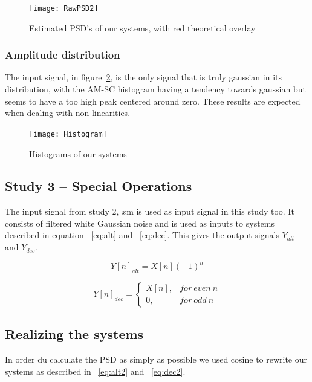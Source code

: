 \documentclass[10pt]{article}
\begin{document}
\begin{figure}[!hp]

    \begin{center}
      \texttt{[image: RawPSD2]}
    \caption{Estimated PSD's of our systems, with red theoretical overlay \label{fig:RawPSD2}}
    \end{center}

\end{figure}

\subsubsection{Amplitude distribution}
The input signal, in figure~\ref{fig:hist}, is the only signal that is truly gaussian in its distribution,
with the AM-SC histogram having a tendency towards gaussian but seems to have a
too high peak centered around zero. These results are expected when dealing with
non-linearities.

\begin{figure}[!hp]

    \begin{center}
      \texttt{[image: Histogram]}
    \caption{Histograms of our systems \label{fig:hist}}
    \end{center}

\end{figure}


\clearpage

\subsection{Study 3 – Special Operations}
The input signal from study 2, $x$m is used as input signal in this study too. It consists of
filtered white Gaussian noise and is used as inputs to systems described in equation ~\ref{eq:alt}
and ~\ref{eq:dec}. This gives the output signals $Y_{alt}$ and $Y_{dec}$.

\begin{equation}
  \label{eq:alt}
  Y[n]_{alt} =X[n](-1)^n
\end{equation}

\begin{equation}
  \label{eq:dec}
  Y[n]_{dec} =
\begin{cases}
   X[n],& for~even~n\\
    0,    & for~odd~n
\end{cases}
\end{equation}

\subsection{Realizing the systems}
In order du calculate the PSD as simply as possible we used cosine to rewrite our systems as described
in ~\ref{eq:alt2} and ~\ref{eq:dec2}.
\end{document}
